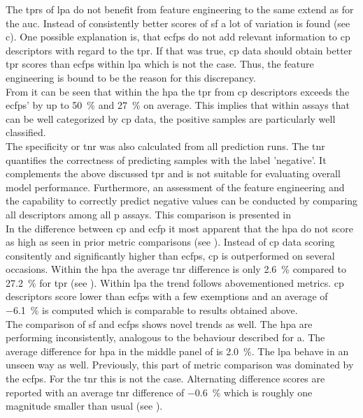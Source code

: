 The \acp{tpr} of \acl{lpa} do not benefit from feature engineering to the same extend as for the \ac{auc}. Instead of consistently better scores of \acl{sf} a lot of variation is found (see c). One possible explanation is, that \acp{ecfp} do not add relevant information to \ac{cp} descriptors with regard to the \ac{tpr}. If that was true, \ac{cp} data should obtain better \ac{tpr} scores than \acp{ecfp} within \acl{lpa} which is not the case. Thus, the feature engineering is bound to be the reason for this discrepancy.\\ 
From  it can be seen that within the \acl{hpa} the \ac{tpr} from \ac{cp} descriptors exceeds the \acp{ecfp}' by up to \SI{50}{\percent} and \SI{27}{\percent} on average. This implies that within assays that can be well categorized by \ac{cp} data, the positive samples are particularly well classified.\\
The specificity or \acf{tnr} was also calculated from all prediction runs. The \ac{tnr} quantifies the correctness of predicting samples with the label 'negative'. It complements the above discussed \ac{tpr} and is not suitable for evaluating overall model performance. Furthermore, an assessment of the feature engineering and the capability to correctly predict negative values can be conducted by comparing all descriptors among all \ac{p} assays. This comparison is presented in \\
In the difference between \ac{cp} and \ac{ecfp} it most apparent that the \acl{hpa} do not score as high as seen in prior metric comparisons (see ). Instead of \ac{cp} data scoring consitently and significantly higher than \acp{ecfp}, \ac{cp} is outperformed on several occasions. Within the \acl{hpa} the average \ac{tnr} difference is only \SI{2.6}{\percent} compared to \SI{27.2}{\percent} for \ac{tpr} (see ). Within \acl{lpa} the trend follows abovementioned metrics. \ac{cp} descriptors score lower than \acp{ecfp} with a few exemptions and an average of \SI{-6.1}{\percent} is computed which is comparable to results obtained above.\\
The comparison of \acl{sf} and \acp{ecfp} shows novel trends as well. The \acl{hpa} are performing inconsistently, analogous to the behaviour described for a. The average difference for \acl{hpa} in the middle panel of  is \SI{2.0}{\percent}. The \acl{lpa} behave in an unseen way as well. Previously, this part of metric comparison was dominated by the \ac{ecfp}s. For the \ac{tnr} this is not the case. Alternating difference scores are reported with an average \ac{tnr} difference of \SI{-0.6}{\percent} which is roughly one magnitude smaller than usual (see ).\\
